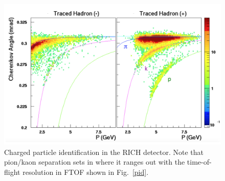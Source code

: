 \documentclass[final,3p,twocolumn]{elsarticle}
\begin{document}
\begin{figure}[htbp!]
\centerline{\includegraphics[width=1.0\columnwidth]{RICH_rec.png}}
\caption{Charged particle identification in the RICH detector. Note that pion/kaon separation sets in where it ranges out with 
 the time-of-flight resolution in FTOF shown in Fig.~\ref{pid}.}
\label{rich_rec}
\end{figure}
\end{document}
